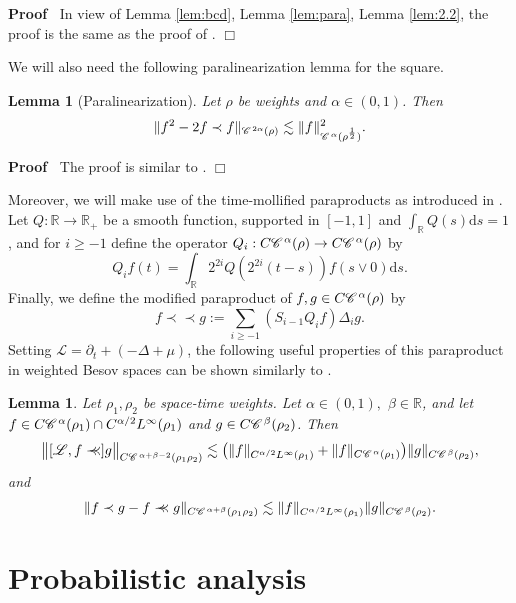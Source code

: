 \documentclass[a4paper,11pt]{article}
\renewcommand{\geq}{\geqslant}
\newenvironment{proof}{\noindent\textbf{Proof\ }}{\hspace*{\fill}$\Box$\medskip}
\newtheorem{lemma}[theorem]{Lemma}
\numberwithin{equation}{section}
\newcommand{\CC}{\mathscr{C} \hspace{.1em}}
\newcommand{\LL}{\mathscr{L}}
\newcommand{\R}{\mathbb{R}}
\newcommand{\Prec}{\prec\!\!\!\prec}
\newcommand{\8}{\infty}
\begin{document}
\begin{proof}
In view of Lemma \ref{lem:bcd}, Lemma \ref{lem:para}, Lemma \ref{lem:2.2}, the proof is the same as the proof of \cite[Lemma 2.4]{GIP}.
\end{proof}


We will also need the following paralinearization lemma for the square.

\begin{lemma}[Paralinearization]\label{lem:paralin}
Let $\rho$ be  weights and $\alpha\in (0,1)$. Then
$$
\|f^2-2f\prec f\|_{\CC^{2\alpha}(\rho)}\lesssim \|f\|_{\CC^\alpha(\rho^\frac{1}{2})}^2.
$$
\end{lemma}

\begin{proof}
The proof is similar to \cite[Lemma~2.6]{GIP}.
\end{proof}



Moreover, we will make use of the time-mollified paraproducts as introduced in \cite[Section 5]{GIP}. Let $Q:\R\to\R_{+}$ be a smooth function, supported in $[-1,1]$ and $\int_{\R}Q(s)\mathrm{d}s=1$, and for $i\geq -1$ define the operator $Q_{i}:C\CC^{\alpha}(\rho)\to C\CC^{\alpha}(\rho)$ by
$$
Q_{i}f(t)=\int_{\R}2^{2i}Q(2^{2i}(t-s))f(s\vee 0)\mathrm{d} s.
$$
Finally, we define the modified paraproduct of $f,g\in C\CC^{\alpha}(\rho)$ by
$$
f\Prec g := \sum_{i\geq -1}(S_{i-1}Q_{i}f)\Delta_{i} g.
$$
Setting  $\LL=\partial_{t} +(-\Delta+\mu)$, the following useful properties of this paraproduct in weighted Besov spaces  can be shown similarly to \cite[Lemma 5.1]{GIP}.

\begin{lemma}\label{lem:5.1}
Let $\rho_{1},\rho_{2}$ be  space-time  weights. Let $\alpha\in (0,1),$ $\beta\in \R$, and let $f\in C\CC^{\alpha}(\rho_{1})\cap C^{\alpha/2}L^{\infty}(\rho_{1})$ and $g\in C\CC^{\beta}(\rho_{2})$. Then
$$
\big\|[\LL,f\Prec] g\big\|_{C\CC^{\alpha+\beta-2}(\rho_{1}\rho_{2})}\lesssim \big( \|f\|_{C^{\alpha/2}L^{\infty}(\rho_{1})}+\|f\|_{C\CC^{\alpha}(\rho_{1})} \big)\|g\|_{C\CC^{\beta}(\rho_{2})},
$$
and
$$
\|f\prec g-f\Prec g\|_{C\CC^{\alpha+\beta}(\rho_{1}\rho_{2})}\lesssim \|f\|_{C^{\alpha/2}L^{\infty}(\rho_{1})}\|g\|_{C\CC^{\beta}(\rho_{2})}.
$$
\end{lemma}







\section{Probabilistic analysis}
\label{s:proba}
\end{document}
